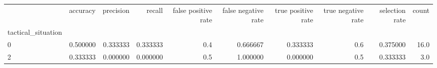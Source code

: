 \begin{tabular}{lrrrrrrrrr}
\toprule
{} &  accuracy &  precision &    recall &  false positive rate &  false negative rate &  true positive rate &  true negative rate &  selection rate &  count \\
tactical\_situation &           &            &           &                      &                      &                     &                     &                 &        \\
\midrule
0                  &  0.500000 &   0.333333 &  0.333333 &                  0.4 &             0.666667 &            0.333333 &                 0.6 &        0.375000 &   16.0 \\
2                  &  0.333333 &   0.000000 &  0.000000 &                  0.5 &             1.000000 &            0.000000 &                 0.5 &        0.333333 &    3.0 \\
\bottomrule
\end{tabular}
